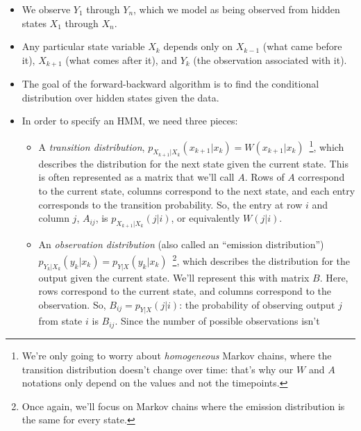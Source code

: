 \documentclass[12pt]{article}
\begin{document}
    \begin{itemize}
        \item We observe $Y_1$ through $Y_n$, which we model as being observed
            from hidden states $X_1$ through $X_n$.
        \item Any particular state variable $X_k$ depends only on $X_{k-1}$
            (what came before it), $X_{k+1}$ (what comes after it), and $Y_k$ (the
            observation associated with it).
        \item The goal of the forward-backward algorithm is to find the
            conditional distribution over hidden states given the data.
        \item In order to specify an HMM, we need three pieces:
            \begin{itemize}
                \item A \emph{transition distribution},
                    $p_{X_{k+1}|X_k}(x_{k+1}|x_k) = W(x_{k+1}|x_k)$~\footnote{%
                    We're only going to worry about \emph{homogeneous} Markov
                    chains, where the transition distribution doesn't change
                    over time: that's why our $W$ and $A$ notations only depend
                    on the values and not the timepoints.}, which describes the
                    distribution for the next state given the current state.
                    This is often represented as a matrix that we'll call $A$.
                    Rows of $A$ correspond to the current state, columns
                    correspond to the next state, and each entry corresponds to
                    the transition probability. So, the entry at row $i$ and
                    column $j$, $A_{ij}$, is $p_{X_{k+1}|X_k}(j|i)$, or
                    equivalently $W(j|i)$.
                \item An \emph{observation distribution} (also called an
                    ``emission distribution'') $p_{Y_k|X_k}(y_k|x_k) =
                    p_{Y|X}(y_k|x_k)$~\footnote{Once again, we'll focus on
                        Markov chains where the emission distribution is the
                    same for every state.}, which
                    describes the distribution for the output given the current
                    state. We'll represent this with matrix $B$. Here, rows
                    correspond to the current state, and columns correspond to
                    the observation. So, $B_{ij} = p_{Y|X}(j|i)$: the
                    probability of observing output $j$ from state $i$ is
                    $B_{ij}$. Since the number of possible observations isn't

\end{itemize}
\end{itemize}
\end{document}
